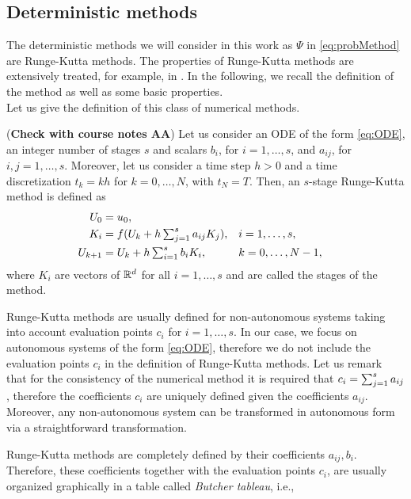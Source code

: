 \subsection{Deterministic methods}

The deterministic methods we will consider in this work as $\Psi$ in \eqref{eq:probMethod} are Runge-Kutta methods. The properties of Runge-Kutta methods are extensively treated, for example, in \cite{HLW02, HaW96}. In the following, we recall the definition of the method as well as some basic properties. \\
Let us give the definition of this class of numerical methods.
\begin{definition}\label{def:RK} (\textbf{Check with course notes AA}) Let us consider an ODE of the form \eqref{eq:ODE}, an integer number of stages $s$ and scalars $b_i$, for $i = 1, \ldots, s$, and $a_{ij}$, for $i, j = 1, \ldots, s$. Moreover, let us consider a time step $h > 0$ and a time discretization $t_k = kh$ for $k = 0, \ldots, N$, with $t_N = T$. Then, an $s$-stage Runge-Kutta method is defined as
\begin{equation}
\begin{aligned}
	U_0 &= u_0, \\
	K_i &= f(U_k + h\textstyle\sum_{j=1}^s a_{ij}K_j), && i = 1, \ldots, s, \\
	U_{k+1} &= U_k + h \textstyle\sum_{i=1}^s b_i K_i, && k = 0, \ldots, N-1,
\end{aligned}
\end{equation}
where $K_i$ are vectors of $\mathbb{R}^d$ for all $i = 1, \ldots, s$ and are called the stages of the method.
\end{definition}
\begin{remark} Runge-Kutta methods are usually defined for non-autonomous systems taking into account evaluation points $c_i$ for $i = 1, \ldots, s$. In our case, we focus on autonomous systems of the form \eqref{eq:ODE}, therefore we do not include the evaluation points $c_i$ in the definition of Runge-Kutta methods. Let us remark that for the consistency of the numerical method it is required that $c_i = \textstyle\sum_{j=1}^s a_{ij}$, therefore the coefficients $c_i$ are uniquely defined given the coefficients $a_{ij}$. Moreover, any non-autonomous system can be transformed in autonomous form via a straightforward transformation. 
\end{remark}
\noindent Runge-Kutta methods are completely defined by their coefficients $a_{ij}, b_i$. Therefore, these coefficients together with the evaluation points $c_i$, are usually organized graphically in a table called \textit{Butcher tableau}, i.e.,
